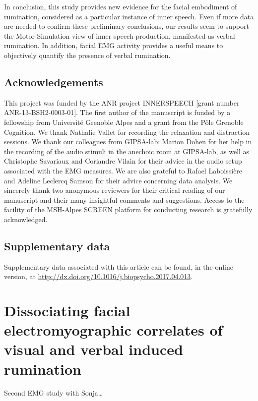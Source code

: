 \documentclass[12pt,]{book}
\theoremstyle{definition}
\theoremstyle{definition}
\theoremstyle{definition}
\theoremstyle{remark}
\begin{document}
In conclusion, this study provides new evidence for the facial
embodiment of rumination, considered as a particular instance of inner
speech. Even if more data are needed to confirm these preliminary
conclusions, our results seem to support the Motor Simulation view of
inner speech production, manifested as verbal rumination. In addition,
facial EMG activity provides a useful means to objectively quantify the
presence of verbal rumination.

\section{Acknowledgements}\label{acknowledgements}

This project was funded by the ANR project INNERSPEECH {[}grant number
ANR-13-BSH2-0003-01{]}. The first author of the manuscript is funded by
a fellowship from Université Grenoble Alpes and a grant from the Pôle
Grenoble Cognition. We thank Nathalie Vallet for recording the
relaxation and distraction sessions. We thank our colleagues from
GIPSA-lab: Marion Dohen for her help in the recording of the audio
stimuli in the anechoic room at GIPSA-lab, as well as Christophe
Savariaux and Coriandre Vilain for their advice in the audio setup
associated with the EMG measures. We are also grateful to Rafael
Laboissière and Adeline Leclercq Samson for their advice concerning data
analysis. We sincerely thank two anonymous reviewers for their critical
reading of our manuscript and their many insightful comments and
suggestions. Access to the facility of the MSH-Alpes SCREEN platform for
conducting research is gratefully acknowledged.

\section{Supplementary data}\label{supplementary-data}

Supplementary data associated with this article can be found, in the
online version, at
\url{http://dx.doi.org/10.1016/j.biopsycho.2017.04.013}.

\chapter{Dissociating facial electromyographic correlates of visual and
verbal induced
rumination}\label{dissociating-facial-electromyographic-correlates-of-visual-and-verbal-induced-rumination}

Second EMG study with Sonja\ldots{}
\end{document}
